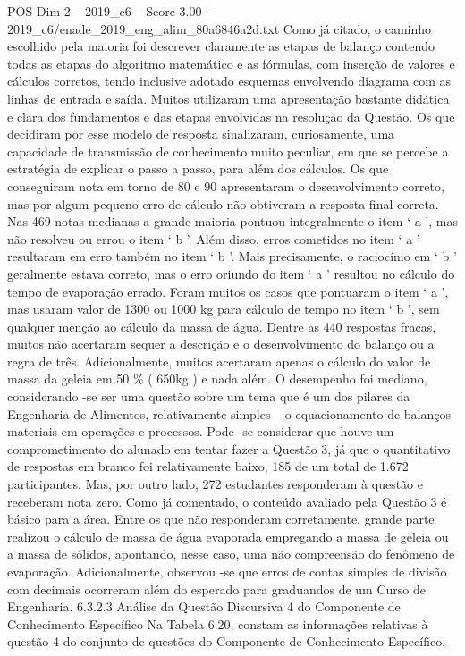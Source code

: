\begin{textsample}{POS Dim 2 – 2019\_c6 – Score 3.00 – 2019\_c6/enade\_2019\_eng\_alim\_80a6846a2d.txt}
Como já citado, o caminho escolhido pela maioria foi descrever claramente as etapas de balanço contendo todas as etapas do algoritmo matemático e as fórmulas, com inserção de valores e cálculos corretos, tendo inclusive adotado esquemas envolvendo diagrama com as linhas de entrada e saída.
Muitos utilizaram uma apresentação bastante didática e clara dos fundamentos e das etapas envolvidas na resolução da Questão.
Os que decidiram por esse modelo de resposta sinalizaram, curiosamente, uma capacidade de transmissão de conhecimento muito peculiar, em que se percebe a estratégia de explicar o passo a passo, para além dos cálculos.
Os que conseguiram nota em torno de 80 e 90 apresentaram o desenvolvimento correto, mas por algum pequeno erro de cálculo não obtiveram a resposta final correta.
Nas 469 notas medianas a grande maioria pontuou integralmente o item ‘ a ’, mas não resolveu ou errou o item ‘ b ’.
Além disso, erros cometidos no item ‘ a ’ resultaram em erro também no item ‘ b ’.
Mais precisamente, o raciocínio em ‘ b ’ geralmente estava correto, mas o erro oriundo do item ‘ a ’ resultou no cálculo do tempo de evaporação errado.
Foram muitos os casos que pontuaram o item ‘ a ’, mas usaram valor de 1300 ou 1000 kg para cálculo de tempo no item ‘ b ’, sem qualquer menção ao cálculo da massa de água.
Dentre as 440 respostas fracas, muitos não acertaram sequer a descrição e o desenvolvimento do balanço ou a regra de três.
Adicionalmente, muitos acertaram apenas o cálculo do valor de massa da geleia em 50 \% ( 650kg ) e nada além.
O desempenho foi mediano, considerando -se ser uma questão sobre um tema que é um dos pilares da Engenharia de Alimentos, relativamente simples – o equacionamento de balanços materiais em operações e processos.
Pode -se considerar que houve um comprometimento do alunado em tentar fazer a Questão 3, já que o quantitativo de respostas em branco foi relativamente baixo, 185 de um total de 1.672 participantes.
Mas, por outro lado, 272 estudantes responderam à questão e receberam nota zero.
Como já comentado, o conteúdo avaliado pela Questão 3 é básico para a área.
Entre os que não responderam corretamente, grande parte realizou o cálculo de massa de água evaporada empregando a massa de geleia ou a massa de sólidos, apontando, nesse caso, uma não compreensão do fenômeno de evaporação.
Adicionalmente, observou -se que erros de contas simples de divisão com decimais ocorreram além do esperado para graduandos de um Curso de Engenharia. 6.3.2.3 Análise da Questão Discursiva 4 do Componente de Conhecimento Específico Na Tabela 6.20, constam as informações relativas à questão 4 do conjunto de questões do Componente de Conhecimento Específico.

\end{textsample}
